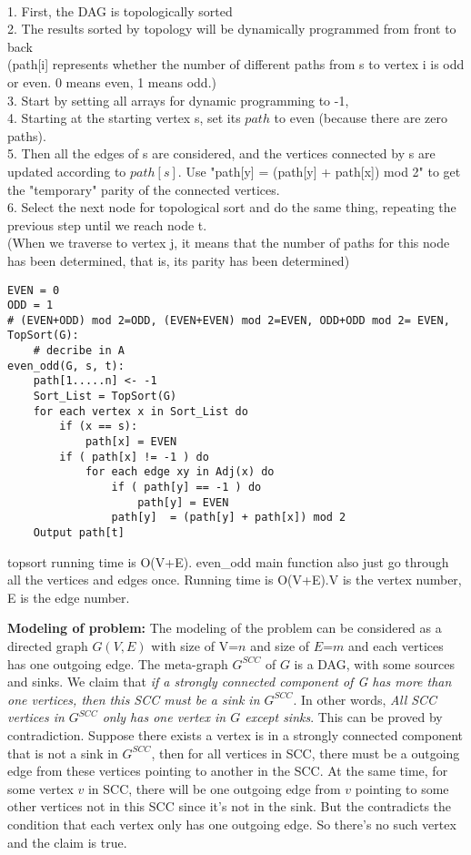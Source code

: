 \documentclass[12pt,a4paper]{article}
\newcommand{\question}[1]{\bigskip\noindent{\textbf{Q{#1} solution}}}
\begin{document}
\question{23.D}\\
1. First, the DAG is topologically sorted
\\2. The results sorted by topology will be dynamically programmed from front to back
\\(path[i] represents whether the number of different paths from s to vertex i is odd or even. 0 means even, 1 means odd.)
\\3. Start by setting all arrays for dynamic programming to -1,
\\4. Starting at the starting vertex s, set its $path$ to even (because there are zero paths).
\\5. Then all the edges of s are considered, and the vertices connected by s are updated according to $path[s]$. Use "path[y] = (path[y] + path[x]) mod 2" to get the "temporary" parity of the connected vertices.
\\6. Select the next node for topological sort and do the same thing, repeating the previous step until we reach node t.
\\(When we traverse to vertex j, it means that the number of paths for this node has been determined, that is, its parity has been determined)
\begin{lstlisting}
EVEN = 0 
ODD = 1
# (EVEN+ODD) mod 2=ODD, (EVEN+EVEN) mod 2=EVEN, ODD+ODD mod 2= EVEN, 
TopSort(G):
	# decribe in A
even_odd(G, s, t):
	path[1.....n] <- -1
	Sort_List = TopSort(G)
	for each vertex x in Sort_List do
		if (x == s):
			path[x] = EVEN
		if ( path[x] != -1 ) do
			for each edge xy in Adj(x) do
				if ( path[y] == -1 ) do
					path[y] = EVEN
				path[y]  = (path[y] + path[x]) mod 2
	Output path[t]
\end{lstlisting}
topsort running time is O(V+E). even\_odd main function also just go through all the vertices and edges once. Running time is O(V+E).V is the vertex number, E is the edge number.\\
\question{24.A}

{\bf Modeling of problem:} The modeling of the problem can be considered as a directed graph $G(V,E)$ with size of V=$n$ and size of $E$=$m$ and each vertices has one outgoing edge. The meta-graph $G^{SCC}$ of $G$ is a DAG, with some sources and sinks. We claim that {\em if a strongly connected component of G has more than one vertices, then this SCC must be a sink in $G^{SCC}$}. In other words, {\em All SCC vertices in $G^{SCC}$ only has one vertex in $G$ except sinks}. This can be proved by contradiction. Suppose there exists a vertex is in a strongly connected component that is not a sink in $G^{SCC}$, then for all vertices in SCC, there must be a outgoing edge from these vertices pointing to another in the SCC. At the same time, for some vertex $v$ in SCC, there will be one outgoing edge from $v$ pointing to some other vertices not in this SCC since it's not in the sink. But the contradicts the condition that each vertex only has one outgoing edge. So there's no such vertex and the claim is true.
\end{document}
